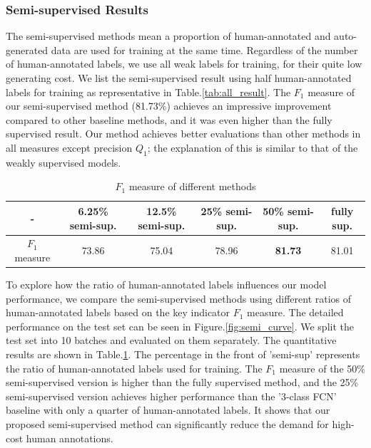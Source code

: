 \documentclass[letterpaper, 10 pt, conference]{ieeeconf}  %
\begin{document}
\subsubsection{Semi-supervised Results}
The semi-supervised methods mean a proportion of human-annotated and auto-generated data are used for training at the same time. Regardless of the number of human-annotated labels, we use all weak labels for training, for their quite low generating cost.
We list the semi-supervised result using half human-annotated labels for training as representative in Table.\ref{tab:all_result}. The $F_1$ measure of our semi-supervised method (81.73\%) achieves an impressive improvement compared to other baseline methods, and it was even higher than the fully supervised result.
Our method achieves better evaluations than other methods in all measures except precision $Q_1$; the explanation of this is similar to that of the weakly supervised models. 
\begin{table}
	\vspace{2mm}
	\caption{$F_1$ measure of different methods}
	\label{tab:semic}
	\centering
	\renewcommand{\arraystretch}{1.5}
	\begin{tabular}{c|ccccc}
		\hline
		- & 6.25\% semi-sup. & 12.5\% semi-sup. & 25\% semi-sup. & 50\% semi-sup. & fully sup.	\\
		\hline
		$F_1$ measure & 73.86 & 75.04 & 78.96 & \textbf{81.73} & 81.01 	\\
		\hline
	\end{tabular}
	\vspace{-3mm}
\end{table}

To explore how the ratio of human-annotated labels influences our model performance, we compare the semi-supervised methods using different ratios of human-annotated labels based on the key indicator $F_1$ measure. The detailed performance on the test set can be seen in Figure.\ref{fig:semi_curve}. We split the test set into 10 batches and evaluated on them separately. The quantitative results are shown in Table.\ref{tab:semic}. The percentage in the front of 'semi-sup' represents the ratio of human-annotated labels used for training. The $F_1$ measure of the 50\% semi-supervised version is higher than the fully supervised method, and the 25\% semi-supervised version achieves higher performance than the '3-class FCN' baseline with only a quarter of human-annotated labels. It shows that our proposed semi-supervised method can significantly reduce the demand for high-cost human annotations.
\end{document}
